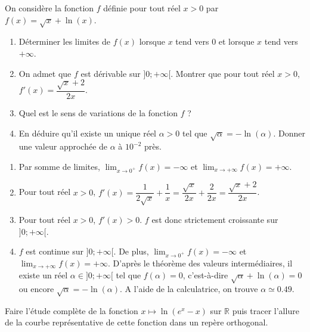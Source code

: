 \documentclass[11pt,fleqn, openany]{book} %
\begin{document}
\begin{exercise}On considère la fonction $f$ définie pour tout réel $x>0$ par $f(x)=\sqrt{x}+\ln(x)$. 
\begin{enumerate}
\item Déterminer les limites de $f(x)$ lorsque $x$ tend vers 0 et lorsque $x$ tend vers $+\infty$.
\item On admet que $f$ est dérivable sur $]0;+\infty[$. Montrer que pour tout réel $x>0$, $f'(x)=\dfrac{\sqrt{x}+2}{2x}$.
\item Quel est le sens de variations de la fonction $f$ ?
\item En déduire qu'il existe un unique réel $\alpha>0$ tel que $\sqrt{\alpha}=-\ln(\alpha)$. Donner une valeur approchée de $\alpha$ à $10^{-2}$ près.\end{enumerate}\end{exercise}

\begin{solution}\hspace{0pt}

\begin{enumerate}
\item Par somme de limites, $\displaystyle\lim_{x\to 0^+}f(x)=-\infty$ et $\displaystyle\lim_{x\to+\infty}f(x)=+\infty$.
\item Pour tout réel $x>0$, $f'(x)=\dfrac{1}{2\sqrt{x}}+\dfrac{1}{x}=\dfrac{\sqrt{x}}{2x}+\dfrac{2}{2x}=\dfrac{\sqrt{x}+2}{2x}$.
\item Pour tout réel $x>0$, $f'(x)>0$. $f$ est donc strictement croissante sur $]0;+\infty[$.
\item $f$ est continue sur $]0;+\infty[$. De plus, $\displaystyle\lim_{x\to 0^+}f(x)=-\infty$ et $\displaystyle\lim_{x\to+\infty}f(x)=+\infty$. D'après le théorème des valeurs intermédiaires, il existe un réel $\alpha \in ]0;+\infty[$ tel que $f(\alpha)=0$, c'est-à-dire $\sqrt{\alpha}+\ln(\alpha)=0$ ou encore $\sqrt{\alpha}=-\ln(\alpha)$. A l'aide de la calculatrice, on trouve $\alpha \simeq 0.49$.
\end{enumerate}

\end{solution}




\begin{exercise}Faire l'étude complète de la fonction $x\mapsto \ln(e^x-x)$ sur $\mathbb{R}$ puis tracer l'allure de la courbe représentative de cette fonction dans un repère orthogonal.\newpage \end{exercise}
\end{document}
